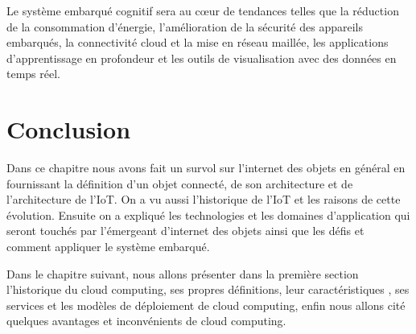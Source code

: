 Le système embarqué cognitif sera au cœur de tendances telles que la réduction de la consommation d'énergie, l'amélioration de la sécurité des appareils embarqués, la connectivité cloud et la mise en réseau maillée, les applications d'apprentissage en profondeur et les outils de visualisation avec des données en temps réel.
\section{Conclusion}
Dans ce chapitre nous avons fait un survol sur l’internet des objets en général en fournissant la définition d'un objet connecté, de son architecture et de l’architecture de l'IoT. On a vu aussi l’historique de l'IoT et les raisons de cette évolution. Ensuite on a expliqué les technologies et les domaines d’application qui seront touchés par l’émergeant d’internet des objets ainsi que les défis et comment appliquer le système embarqué.


 Dans le chapitre suivant, nous allons présenter dans la première section l'historique du cloud computing, ses propres définitions, leur caractéristiques , ses services et les modèles de déploiement de cloud computing, enfin nous allons cité quelques avantages et inconvénients de cloud computing.





